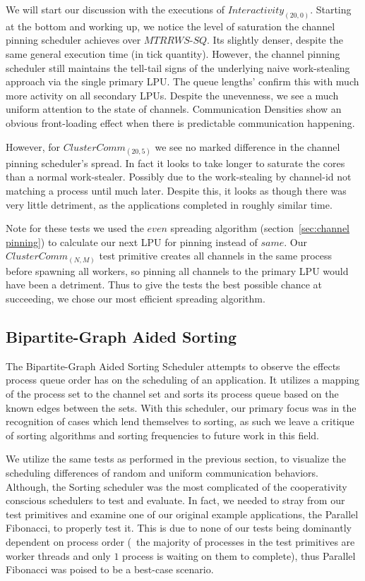 We will start our discussion with the executions of $Interactivity_{(20,0)}$.
Starting at the bottom and working up, we notice the level of saturation the 
channel pinning scheduler achieves over $MTRRWS$-$SQ$. Its slightly denser,
despite the same general execution time (in tick quantity). However, the channel
pinning scheduler still maintains the tell-tail signs of the underlying 
naive work-stealing approach via the single primary LPU. The queue lengths'
confirm this with much more activity on all secondary LPUs. Despite the 
unevenness, we see a much uniform attention to the state of channels.
Communication Densities show an obvious front-loading effect when there is 
predictable communication happening. 

However, for $ClusterComm_{(20,5)}$ we see no marked difference in the channel
pinning scheduler's spread. In fact it looks to take longer to saturate the 
cores than a normal work-stealer. Possibly due to the work-stealing by channel-id
not matching a process until much later. Despite this, it looks as though there 
was very little detriment, as the applications completed in roughly similar time.

Note for these tests we used the $even$ spreading algorithm 
(section~\ref{sec:channel pinning}) to calculate our next LPU for pinning instead of
$same$. Our $ClusterComm_{(N,M)}$ test primitive creates all channels in the same
process before spawning all workers, so pinning all channels to the primary LPU 
would have been a detriment. Thus to give the tests the best possible chance
at succeeding, we chose our most efficient spreading algorithm.

\subsection{Bipartite-Graph Aided Sorting}\label{sec:results-smartsort}

The Bipartite-Graph Aided Sorting Scheduler attempts to observe the effects
process queue order has on the scheduling of an application. It utilizes a mapping
of the process set to the channel set and sorts its process queue based on 
the known edges between the sets. With this scheduler, our primary focus was
in the recognition of cases which lend themselves to sorting, as such we 
leave a critique of sorting algorithms and sorting frequencies to future work
in this field.

We utilize the same tests as performed in the previous section, to visualize the
scheduling differences of random and uniform communication behaviors. 
Although, the Sorting scheduler was the most complicated of the cooperativity 
conscious schedulers to test and evaluate. In fact, we needed to stray from our 
test primitives and examine one of our original example applications, the 
Parallel Fibonacci, to properly test it. This is due to none of our tests
being dominantly dependent on process order (\ie~the majority of processes in the
test primitives are worker threads and only $1$ process is waiting on them to
complete), thus Parallel Fibonacci was poised to be a best-case scenario.

